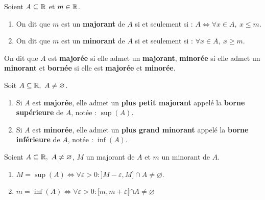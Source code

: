 \begin{definition}
    Soient $A \subseteq \mathbb{R}$ et $m \in \mathbb{R}$.
    \begin{enumerate}
        \item On dit que $m$ est un \textbf{majorant} de $A$ si et seulement si : $A \iff \forall x \in A,\ x \leq m$.
        \item On dit que $m$ est un \textbf{minorant} de $A$ si et seulement si : $\forall x \in A,\ x \geq m$.
    \end{enumerate}
    On dit que $A$ est \textbf{majorée} si elle admet un \textbf{majorant}, \textbf{minorée} si elle admet un \textbf{minorant} et \textbf{bornée} si elle est \textbf{majorée} et \textbf{minorée}.
\end{definition}

\begin{theorem}
    Soit $A \subseteq \mathbb{R},\ A \neq \varnothing$. 
    \begin{enumerate}
    	\item Si $A$ est \textbf{majorée}, elle admet un \textbf{plus petit majorant} appelé la \textbf{borne supérieure} de $A$, notée : $\sup(A)$.
    	\item Si $A$ est \textbf{minorée}, elle admet un \textbf{plus grand minorant} appelé la \textbf{borne inférieure} de $A$, notée : $\inf(A)$.
    \end{enumerate}
\end{theorem}

\begin{proposition}
    Soient $A \subseteq \mathbb{R},\ A \neq \varnothing$, $M$ un majorant de $A$ et $m$ un minorant de $A$.  
    \begin{enumerate}
        \item $M = \sup(A) \iff \forall \varepsilon > 0 : ]M - \varepsilon, M] \cap A \neq \varnothing$.
        \item $m = \inf(A) \iff \forall \varepsilon > 0 : [m, m + \varepsilon[ \cap A \neq \varnothing $
    \end{enumerate}
\end{proposition}
